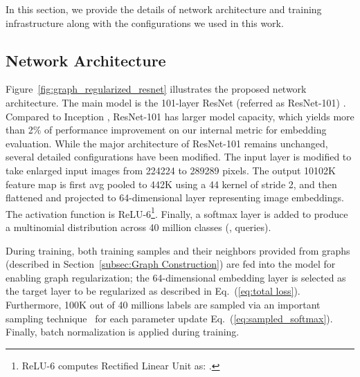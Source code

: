 \documentclass[sigconf]{acmart}
\begin{document}
In this section, we provide the details of network architecture and training infrastructure along with the configurations we used in this work.
\subsection{Network Architecture}
\label{subsec:Network Architecture}

Figure~\ref{fig:graph_regularized_resnet} illustrates the proposed network architecture. The main model is the 101-layer ResNet (referred as ResNet-101) \cite{he2016deep}. Compared to Inception \cite{szegedy2015going}, ResNet-101 has larger model capacity, which yields more than 2\% of performance improvement on our internal metric for embedding evaluation. While the major architecture of ResNet-101 remains unchanged, several detailed configurations have been modified. The input layer is modified to take enlarged input images from 224224 to 289289 pixels. The output 10102K feature map is first avg pooled to 442K using a 44 kernel of stride 2, and then flattened and projected to 64-dimensional layer representing image embeddings. The activation function is ReLU-6\footnote{ReLU-6 computes Rectified Linear Unit as: .}. Finally, a softmax layer is added to produce a multinomial distribution across 40 million classes (\eg, queries).

\begin{comment}
First, the input layer is modified to take enlarged input images from 224224 to 289289 pixels. Next, the size of average pooling is modified from (3, 3) square to (4, 2) rectangle. The last average pooling layer is then flattened and connected to a 64-dimensional layer representing image embeddings. The activation function is ReLU-6\footnote{ReLU-6 computes Rectified Linear Unit as: .}. Finally, a softmax layer is added to produce a multinomial distribution across 40 million classes (\eg, queries). 
\reminder{Modify the description: "ResNet 101 with 289x289 input. The output 10x10 x 2k feature map is first avg pooled to 4x4x2k using a 4x4 kernel of stride 2, and then flattened and projected to 64-dim embedding."}
\end{comment}


During training, both training samples and their neighbors provided from graphs (described in Section~\ref{subsec:Graph Construction}) are fed into the model for enabling graph regularization; the 64-dimensional embedding layer is selected as the target layer to be regularized as described in Eq.~(\ref{eq:total loss}). Furthermore, 100K out of 40 millions labels are sampled via an important sampling technique~\cite{bengio2008adaptive} for each parameter update Eq.~(\ref{eq:sampled_softmax}). Finally, batch normalization is applied during training.
\end{document}
